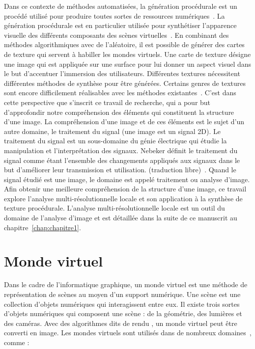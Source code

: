 Dans ce contexte de méthodes automatisées, la génération procédurale est un procédé utilisé pour produire toutes sortes de ressources numériques~\cite{smelik_survey_2014}. La génération procédurale est en particulier utilisée pour synthétiser l'apparence visuelle des différents composants des scènes virtuelles~\cite{alessio_procedural_2021}. En combinant des méthodes algorithmiques avec de l'aléatoire, il est possible de générer des cartes de texture qui servent à habiller les mondes virtuels. Une carte de texture désigne une image qui est appliquée sur une surface pour lui donner un aspect visuel dans le but d'accentuer l'immersion des utilisateurs. Différentes textures nécessitent différentes méthodes de synthèse pour être générées. Certains genres de textures sont encore difficilement réalisables avec les méthodes existantes~\cite{lutz_cyclostationary-gaussian_2021}. C'est dans cette perspective que s'inscrit ce travail de recherche, qui a pour but d'approfondir notre compréhension des éléments qui constituent la structure d'une image. La compréhension d'une image et de ces éléments est le sujet d'un autre domaine, le traitement du signal (une image est un signal 2D). Le traitement du signal est un sous-domaine du génie électrique qui étudie la manipulation et l'interprétation des signaux. Nebeker définit le traitement du signal comme étant \og [...] l'ensemble des changements appliqués aux signaux dans le but d'améliorer leur transmission et utilisation. \fg (traduction libre)~\cite{nebeker_fifty_1998}. Quand le signal étudié est une image, le domaine est appelé traitement ou analyse d'image. Afin obtenir une meilleure compréhension de la structure d'une image, ce travail explore l'analyse multi-résolutionnelle locale et son application à la synthèse de texture procédurale. L'analyse multi-résolutionnelle locale est un outil du domaine de l'analyse d'image et est détaillée dans la suite de ce manuscrit au chapitre~\ref{chap:chapitre1}.

\section{Monde virtuel}

Dans le cadre de l'informatique graphique, un monde virtuel est une méthode de représentation de scènes au moyen d'un support numérique. Une scène est une collection d'objets numériques qui interagissent entre eux. Il existe trois sortes d'objets numériques qui composent une scène : de la géométrie, des lumières et des caméras. Avec des algorithmes dits de \og rendu \fg, un monde virtuel peut être converti en image. Les mondes virtuels sont utilisés dans de nombreux domaines~\cite{magnenat-thalmann_introduction_1986}, comme :

